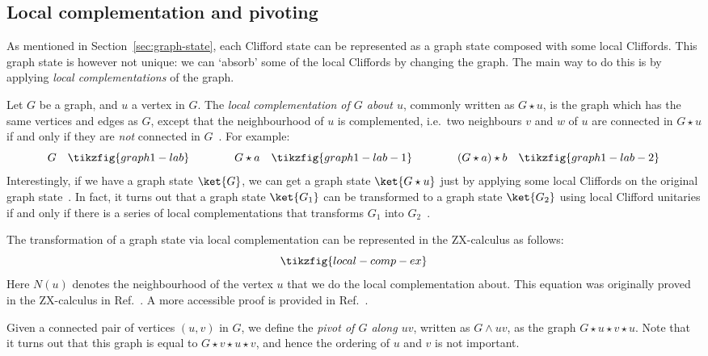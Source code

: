 \documentclass[a4paper,onecolumn,superscriptaddress,11pt,%
				unpublished,%
				allowfontchageintitle,%
				]{quantumarticle}
\begin{document}
\subsection{Local complementation and pivoting}

As mentioned in Section~\ref{sec:graph-state}, each Clifford state can be represented as a graph state composed with some local Cliffords. This graph state is however not unique: we can `absorb' some of the local Cliffords by changing the graph. The main way to do this is by applying \emph{local complementations}  of the graph.

Let $G$ be a graph, and $u$ a vertex in $G$. The \emph{local complementation of $G$ about $u$}, commonly written as $G\star u$, is the graph which has the same vertices and edges as $G$, except that the neighbourhood of $u$ is complemented, i.e.~two neighbours $v$ and $w$ of $u$ are connected in $G\star u$ if and only if they are \emph{not} connected in $G$~\cite{kotzig}.
For example:
\begin{equation*}
G\quad\tikzfig{graph1-lab}\qquad\qquad G\star a\quad\tikzfig{graph1-lab-1}\qquad\qquad (G\star a) \star b\quad\tikzfig{graph1-lab-2}
\end{equation*}
Interestingly, if we have a graph state $\ket{G}$, we can get a graph state $\ket{G\star u}$ just by applying some local Cliffords on the original graph state~\cite{vandennest2004graphical}.
In fact, it turns out that a graph state $\ket{G_1}$ can be transformed to a graph state $\ket{G_2}$ using local Clifford unitaries if and only if there is a series of local complementations that transforms $G_1$ into $G_2$~\cite{elliott2008graphical}.

The transformation of a graph state via local complementation can be represented in the ZX-calculus as follows:
\begin{equation}\label{eq:local-comp-zx}
\tikzfig{local-comp-ex}
\end{equation}
Here $N(u)$ denotes the neighbourhood of the vertex $u$ that we do the local complementation about.
This equation was originally proved in the ZX-calculus in Ref.~\cite{DP1}. A more accessible proof is provided in Ref.~\cite[Prop.~9.125]{CKbook}.

Given a connected pair of vertices $(u,v)$ in $G$, we define the \emph{pivot of $G$ along $uv$}, written as $G\wedge uv$, as the graph $G\star u\star v\star u$. Note that it turns out that this graph is equal to $G\star v \star u \star v$, and hence the ordering of $u$ and $v$ is not important.
\end{document}
